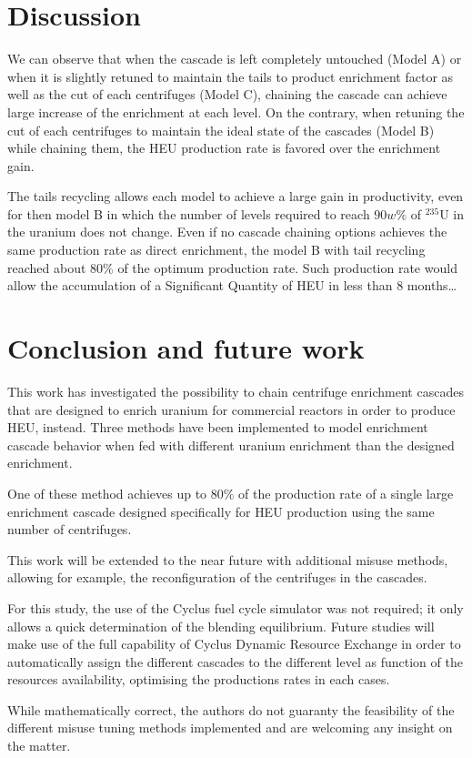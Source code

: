 \section{Discussion}

We can observe that when the cascade is left completely untouched (Model A) or
when it is slightly retuned to maintain the tails to product enrichment factor
as well as the cut of each centrifuges (Model C), chaining the cascade can
achieve large increase of the enrichment at each level.  On the contrary, when
retuning the cut of each centrifuges to maintain the ideal state of the cascades
(Model B) while chaining them, the \gls{HEU} production rate is favored over the
enrichment gain.

The tails recycling allows each model to achieve a large gain in productivity,
even for then model B in which the number of levels required to reach $90w\%$ of
$^{235}$U in the uranium does not change. Even if no cascade chaining options
achieves the same production rate as direct enrichment, the model B with tail
recycling reached about $80\%$ of the optimum production rate. Such production
rate would allow the accumulation of a Significant Quantity of \gls{HEU} in less
than 8 months\ldots


\section{Conclusion and future work}

This work has investigated the possibility to chain centrifuge enrichment
cascades that are designed to enrich uranium for commercial reactors in order to
produce \gls{HEU}, instead. Three methods have been implemented to model enrichment
cascade behavior when fed with different uranium enrichment than the designed
enrichment. 

One of these method achieves up to $80\%$ of the production rate of a single
large enrichment cascade designed specifically for \gls{HEU} production using
the same number of centrifuges.

This work will be extended to the near future with additional misuse methods,
allowing for example, the reconfiguration of the centrifuges in the cascades.

For this study, the use of the Cyclus fuel cycle simulator was not required;
it only allows a quick determination of the blending equilibrium. Future
studies will make use of the full capability of Cyclus Dynamic Resource
Exchange in order to automatically assign the different cascades to the
different level as function of the resources availability, optimising the
productions rates in each cases.

While mathematically correct, the authors do not guaranty the feasibility of the
different misuse tuning methods implemented and are welcoming any insight on the
matter.


